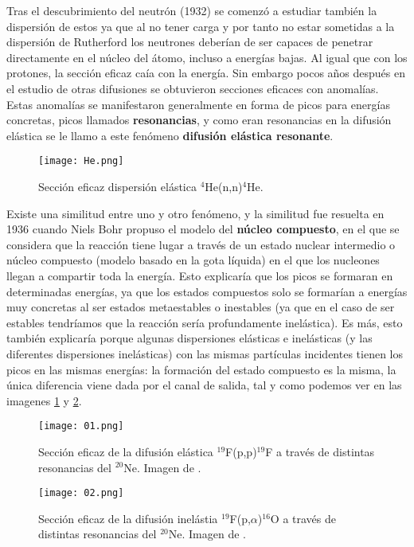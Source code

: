 \documentclass[fleqn,11pt]{SelfArx} %
\begin{document}
Tras el descubrimiento del neutrón (1932) se comenzó a estudiar también la dispersión de estos ya que al no tener carga y por tanto no estar sometidas a la dispersión de Rutherford los neutrones deberían de ser capaces de penetrar directamente en el núcleo del átomo, incluso a energías bajas. Al igual que con los protones, la sección eficaz caía con la energía. Sin embargo pocos años después en el estudio de otras difusiones se obtuvieron secciones eficaces con anomalías. Estas anomalías se manifestaron generalmente en forma de picos para energías concretas, picos llamados \textbf{resonancias}, y como eran resonancias en la difusión elástica se le llamo a este fenómeno \textbf{difusión elástica resonante}.

\begin{figure}[h!] \centering
	\texttt{[image: He.png]}
	\caption{Sección eficaz dispersión elástica $^4$He(n,n)$^4$He.}
\end{figure}
Existe una similitud entre uno y otro fenómeno, y la similitud fue resuelta en 1936 cuando Niels Bohr propuso el modelo del \textbf{núcleo compuesto}, en el que se considera que la reacción tiene lugar a través de un estado nuclear intermedio o núcleo compuesto (modelo basado en la gota líquida) en el que los nucleones llegan a compartir toda la energía. Esto explicaría que los picos se formaran en determinadas energías, ya que los estados compuestos solo se formarían a energías muy concretas al ser estados metaestables o inestables (ya que en el caso de ser estables tendríamos que la reacción sería profundamente inelástica). Es más, esto también explicaría porque algunas dispersiones elásticas e inelásticas (y las diferentes dispersiones inelásticas) con las mismas partículas incidentes tienen los picos en las mismas energías: la formación del estado compuesto es la misma, la única diferencia viene dada por el canal de salida, tal y como podemos ver en las imagenes \ref{Fig:02} y \ref{Fig:03}.

\begin{figure}[h!] \centering
	\texttt{[image: 01.png]}
	\caption{Sección eficaz de la difusión elástica $^{19}$F(p,p)$^{19}$F a través de distintas resonancias del $^{20}$Ne. Imagen de \cite{USC}.}
	\label{Fig:02}
\end{figure}
\begin{figure}[h!] \centering
	\texttt{[image: 02.png]}
	\caption{Sección eficaz de la difusión inelástia $^{19}$F(p,$\alpha$)$^{16}$O a través de distintas resonancias del $^{20}$Ne. Imagen de \cite{USC}.}
	\label{Fig:03}
\end{figure}
\end{document}
